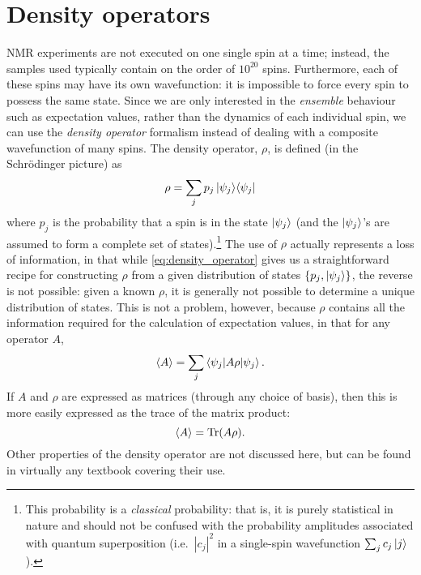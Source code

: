 \section{Density operators}
\label{sec:theory__density_operators}

NMR experiments are not executed on one single spin at a time; instead, the samples used typically contain on the order of $10^{20}$ spins.
Furthermore, each of these spins may have its own wavefunction: it is impossible to force every spin to possess the same state.
Since we are only interested in the \textit{ensemble} behaviour such as expectation values, rather than the dynamics of each individual spin, we can use the \textit{density operator} formalism instead of dealing with a composite wavefunction of many spins.
The density operator, $\rho$, is defined (in the Schr\"odinger picture) as
\begin{equation}
    \label{eq:density_operator}
    \rho = \sum_j p_j \ket{\psi_j}\!\bra{\psi_j}
\end{equation}
where $p_j$ is the probability that a spin is in the state $\ket{\psi_j}$ (and the $\ket{\psi_j}$'s are assumed to form a complete set of states).\footnote{This probability is a \textit{classical} probability: that is, it is purely statistical in nature and should not be confused with the probability amplitudes associated with quantum superposition (i.e.\ $|c_j|^2$ in a single-spin wavefunction $\sum_j c_j \ket{j}$).}
The use of $\rho$ actually represents a loss of information, in that while \cref{eq:density_operator} gives us a straightforward recipe for constructing $\rho$ from a given distribution of states $\{p_j, \ket{\psi_j}\}$, the reverse is not possible: given a known $\rho$, it is generally not possible to determine a unique distribution of states.
This is not a problem, however, because $\rho$ contains all the information required for the calculation of expectation values, in that for any operator $A$,
\begin{equation}
    \label{eq:density_expectation}
    \langle A \rangle = \sum_j \braket{\psi_j | A\rho | \psi_j}.
\end{equation}
If $A$ and $\rho$ are expressed as matrices (through any choice of basis), then this is more easily expressed as the trace of the matrix product:
\begin{equation}
    \label{eq:density_trace}
    \langle A \rangle = \operatorname{Tr}(A\rho).
\end{equation}
Other properties of the density operator are not discussed here, but can be found in virtually any textbook covering their use.\autocite{Blum2012,CohenTannoudji2020,Sakurai2021}


